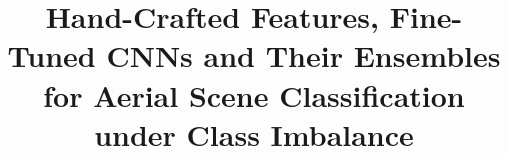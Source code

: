 \documentclass[conference]{IEEEtran}
\begin{document}
\title{Hand-Crafted Features, Fine-Tuned CNNs and Their Ensembles for Aerial Scene Classification under Class Imbalance}

\author{
}

\maketitle













\end{document}
